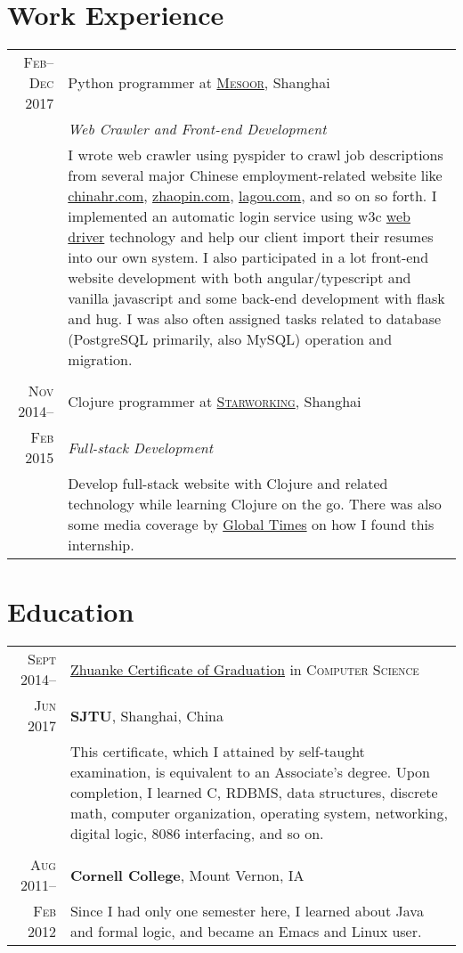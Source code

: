 \documentclass[a4paper,11pt]{article}
\begin{document}
\section{Work Experience}
\begin{tabular}{r|p{11cm}}
  \textsc{Feb--Dec 2017} & Python programmer at \href{https://www.mesoor.com/}{\textsc{Mesoor}}, Shanghai \\
                         & \emph{Web Crawler and Front-end Development}\\
                         & \footnotesize I wrote web crawler using pyspider to crawl job descriptions from several major Chinese employment-related website like \href{http://www.chinahr.com/}{chinahr.com}, \href{https://www.zhaopin.com/}{zhaopin.com}, \href{https://www.lagou.com/}{lagou.com}, and so on so forth.  I implemented an automatic login service using w3c \href{https://github.com/w3c/web-platform-tests/pull/6743}{web driver} technology and help our client import their resumes into our own system.  I also participated in a lot front-end website development with both angular/typescript and vanilla javascript and some back-end development with flask and hug.  I was also often assigned tasks related to database (PostgreSQL primarily, also MySQL) operation and migration.\\
  \multicolumn{2}{c}{} \\
  \textsc{Nov 2014--}    & Clojure programmer at \href{http://www.starworking.com/}{\textsc{Starworking}}, Shanghai \\
  \textsc{Feb 2015}      & \emph{Full-stack Development}\\
                         & \footnotesize Develop full-stack website with Clojure and related technology while learning Clojure on the go.  There was also some media coverage by \href{http://www.globaltimes.cn/content/871111.shtml}{Global Times} on how I found this internship.
\end{tabular}

\section{Education}
\begin{tabular}{rp{11.5cm}}
  \textsc{Sept 2014--} & \href{http://www.chsi.com.cn/en/news/201312/20131202/663878204.html}{Zhuanke Certificate of Graduation} in \textsc{Computer Science}\\
  \textsc{Jun 2017}    & \textbf{SJTU}, Shanghai, China \\
                       & \footnotesize This certificate, which I attained by self-taught examination, is equivalent to an Associate's degree.  Upon completion, I learned C, RDBMS, data structures, discrete math, computer organization, operating system, networking, digital logic, 8086 interfacing, and so on.\\&\\
  \textsc{Aug 2011--}  & \textbf{Cornell College}, Mount Vernon, IA\\
  \textsc{Feb 2012}    & \footnotesize Since I had only one semester here, I learned about Java and formal logic, and became an Emacs and Linux user.
\end{tabular}
\end{document}
